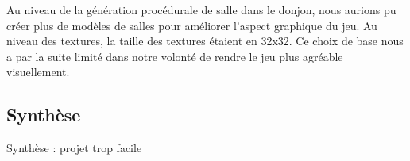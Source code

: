 \documentclass[a4paper, 12pt]{article}
\begin{document}
Au niveau de la génération procédurale de salle dans le donjon, nous aurions
pu créer plus de modèles de salles pour améliorer l’aspect graphique du jeu.
Au niveau des textures, la taille des textures étaient en 32x32. Ce choix de
base nous a par la suite limité dans notre volonté de rendre le jeu plus
agréable visuellement.
\newpage
\subsection{Synthèse}
Synthèse : projet trop facile
\newpage

\listoffigures
\end{document}
